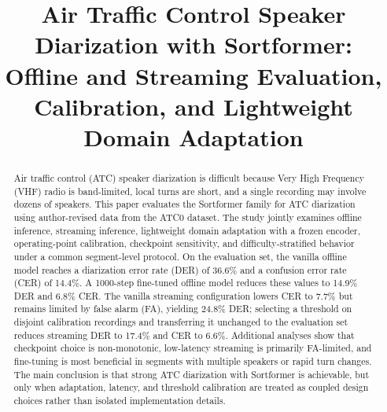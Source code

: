 \documentclass[conference]{IEEEtran}
\newif\ifidentifiedversion
\begin{document}
\title{Air Traffic Control Speaker Diarization with Sortformer: Offline and Streaming Evaluation, Calibration, and Lightweight Domain Adaptation}

\ifidentifiedversion
\author{
\IEEEauthorblockN{Shital Pandey}
\IEEEauthorblockA{Embry-Riddle Aeronautical University\\
1 Aerospace Blvd, Daytona Beach, FL 32114\\
pandeys2@my.erau.edu}
\and
\IEEEauthorblockN{Jianhua Liu}
\IEEEauthorblockA{Embry-Riddle Aeronautical University\\
1 Aerospace Blvd, Daytona Beach, FL 32114\\
liu620@erau.edu}
}
\else
\author{
\and
{}
}
\fi

\maketitle

\begin{abstract}
Air traffic control (ATC) speaker diarization is difficult because Very High Frequency (VHF) radio is band-limited, local turns are short, and a single recording may involve dozens of speakers. This paper evaluates the Sortformer family for ATC diarization using author-revised data from the ATC0 dataset. The study jointly examines offline inference, streaming inference, lightweight domain adaptation with a frozen encoder, operating-point calibration, checkpoint sensitivity, and difficulty-stratified behavior under a common segment-level protocol. On the evaluation set, the vanilla offline model reaches a diarization error rate (DER) of 36.6\% and a confusion error rate (CER) of 14.4\%. A 1000-step fine-tuned offline model reduces these values to 14.9\% DER and 6.8\% CER. The vanilla streaming configuration lowers CER to 7.7\% but remains limited by false alarm (FA), yielding 24.8\% DER; selecting a threshold on disjoint calibration recordings and transferring it unchanged to the evaluation set reduces streaming DER to 17.4\% and CER to 6.6\%. Additional analyses show that checkpoint choice is non-monotonic, low-latency streaming is primarily FA-limited, and fine-tuning is most beneficial in segments with multiple speakers or rapid turn changes. The main conclusion is that strong ATC diarization with Sortformer is achievable, but only when adaptation, latency, and threshold calibration are treated as coupled design choices rather than isolated implementation details.
\end{abstract}
\end{document}
